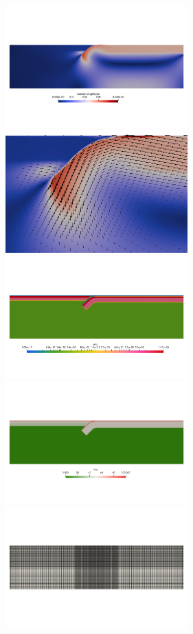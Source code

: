\begin{center}
\includegraphics[width=7cm]{python_codes/fieldstone_67/images/vel}
\includegraphics[width=7cm]{python_codes/fieldstone_67/images/vel2}\\
\includegraphics[width=7cm]{python_codes/fieldstone_67/images/eta}
\includegraphics[width=7cm]{python_codes/fieldstone_67/images/rho}\\
\includegraphics[width=7cm]{python_codes/fieldstone_67/images/grid}

\end{center}
